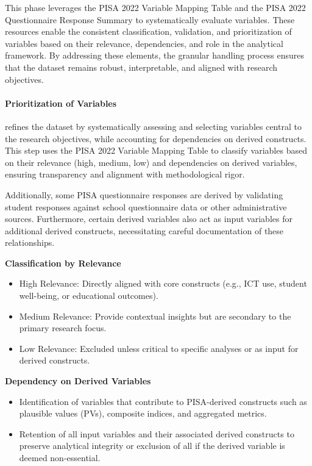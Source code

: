 \documentclass[
]{article}
\begin{document}
This phase leverages the PISA 2022 Variable Mapping Table and the PISA
2022 Questionnaire Response Summary to systematically evaluate
variables. These resources enable the consistent classification,
validation, and prioritization of variables based on their relevance,
dependencies, and role in the analytical framework. By addressing these
elements, the granular handling process ensures that the dataset remains
robust, interpretable, and aligned with research objectives.

\hypertarget{prioritization-of-variables}{%
\paragraph{Prioritization of
Variables}\label{prioritization-of-variables}}

refines the dataset by systematically assessing and selecting variables
central to the research objectives, while accounting for dependencies on
derived constructs. This step uses the PISA 2022 Variable Mapping Table
to classify variables based on their relevance (high, medium, low) and
dependencies on derived variables, ensuring transparency and alignment
with methodological rigor.

Additionally, some PISA questionnaire responses are derived by
validating student responses against school questionnaire data or other
administrative sources. Furthermore, certain derived variables also act
as input variables for additional derived constructs, necessitating
careful documentation of these relationships.

\textbf{Classification by Relevance}

\begin{itemize}
\item
  High Relevance: Directly aligned with core constructs (e.g., ICT use,
  student well-being, or educational outcomes).
\item
  Medium Relevance: Provide contextual insights but are secondary to the
  primary research focus.
\item
  Low Relevance: Excluded unless critical to specific analyses or as
  input for derived constructs.
\end{itemize}

\textbf{Dependency on Derived Variables}

\begin{itemize}
\item
  Identification of variables that contribute to PISA-derived constructs
  such as plausible values (PVs), composite indices, and aggregated
  metrics.
\item
  Retention of all input variables and their associated derived
  constructs to preserve analytical integrity or exclusion of all if the
  derived variable is deemed non-essential.
\end{itemize}
\end{document}
